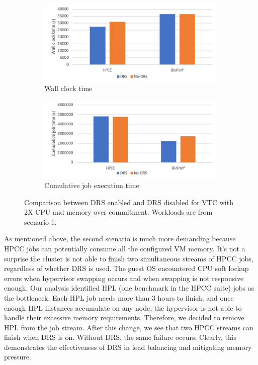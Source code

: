 \begin{figure}
     \centering
     \begin{subfigure}[b]{0.45\textwidth}
         \centering
         \includegraphics[width=\textwidth]{Figures/memory_wct}
         \caption{Wall clock time}
         \label{fig:memory_wct}
     \end{subfigure}
     \hfill
     \begin{subfigure}[b]{0.45\textwidth}
         \centering
         \includegraphics[width=\textwidth]{Figures/memory_cjet}
         \caption{Cumulative job execution time}
         \label{fig:memory_cjet}
     \end{subfigure}
     \caption{Comparison between DRS enabled and DRS disabled for VTC with 2X CPU and memory over-commitment. Workloads are from scenario 1. }
     \label{fig:memory_scenario1}
\end{figure}

As mentioned above, the second scenario is much more demanding because HPCC jobs can potentially consume all the configured VM memory. It's not a surprise the cluster is not able to finish two simultaneous streams of HPCC jobs, regardless of whether DRS is used. The guest OS encountered CPU soft lockup errors when hypervisor swapping occurs and when swapping is not responsive enough. Our analysis identified HPL (one benchmark in the HPCC suite) jobs as the bottleneck. Each HPL job needs more than 3 hours to finish, and once enough HPL instances accumulate on any node, the hypervisor is not able to handle their excessive memory requirements. Therefore, we decided to remove HPL from the job stream. After this change, we see that two HPCC streams can finish when DRS is on. Without DRS, the same failure occurs. Clearly, this demonstrates the effectiveness of DRS in load balancing and mitigating memory pressure. 

